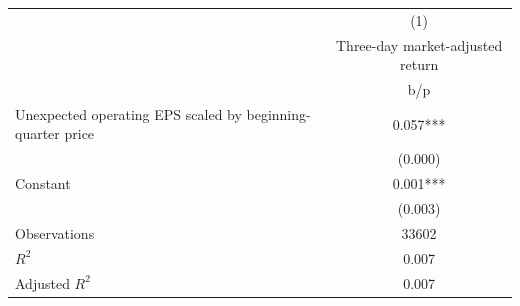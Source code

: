 {
\def\sym#1{\ifmmode^{#1}\else\(^{#1}\)\fi}
\begin{tabular}{l*{1}{c}}
\hline\hline
                    &\multicolumn{1}{c}{(1)}\\
                    &\multicolumn{1}{c}{Three-day market-adjusted return}\\
                    &         b/p   \\
\hline
Unexpected operating EPS scaled by beginning-quarter price&       0.057***\\
                    &     (0.000)   \\
Constant            &       0.001***\\
                    &     (0.003)   \\
\hline
Observations        &       33602   \\
\(R^{2}\)           &       0.007   \\
Adjusted \(R^{2}\)  &       0.007   \\
\hline\hline
\end{tabular}
}
